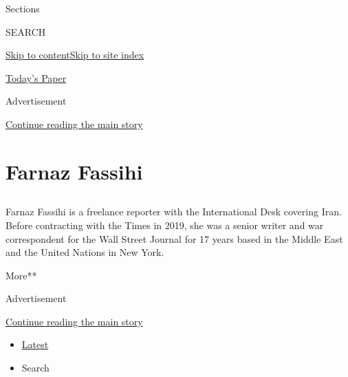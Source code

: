 Sections

SEARCH

\protect\hyperlink{site-content}{Skip to
content}\protect\hyperlink{site-index}{Skip to site index}

\href{https://myaccount.nytimes.com/auth/login?response_type=cookie\&client_id=vi}{}

\href{https://www.nytimes.com/section/todayspaper}{Today's Paper}

Advertisement

\protect\hyperlink{after-top}{Continue reading the main story}

\hypertarget{farnaz-fassihi}{%
\section{Farnaz Fassihi}\label{farnaz-fassihi}}

\subsection{}

Farnaz Fassihi is a freelance reporter with the International Desk
covering Iran. Before contracting with the Times in 2019, she was a
senior writer and war correspondent for the Wall Street Journal for 17
years based in the Middle East and the United Nations in New York.

More**

Advertisement

\protect\hyperlink{after-mid1}{Continue reading the main story}

\begin{itemize}
\tightlist
\item
  \protect\hyperlink{stream-panel}{Latest}
\item
  Search
\end{itemize}

